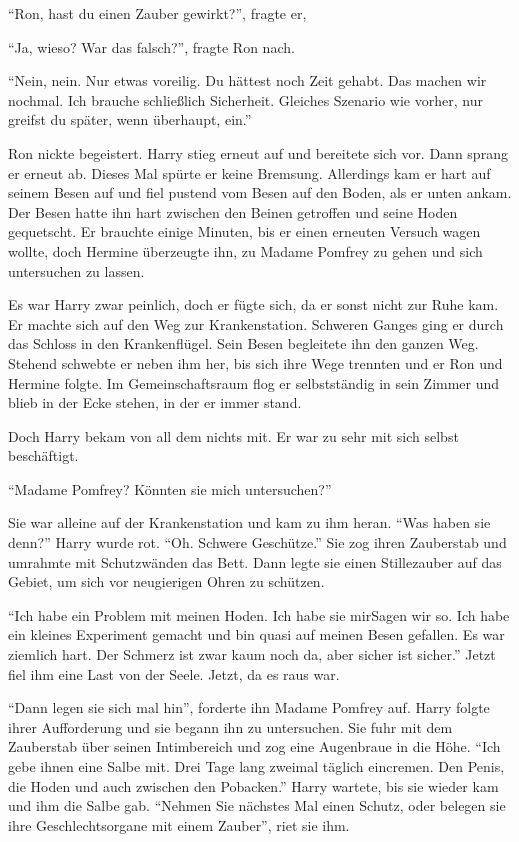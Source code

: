 \enquote{Ron, hast du einen Zauber gewirkt?}, fragte er,

\enquote{Ja, wieso? War das falsch?}, fragte Ron nach.

\enquote{Nein, nein. Nur etwas voreilig. Du hättest noch Zeit gehabt. Das machen wir nochmal. Ich brauche schließlich Sicherheit. Gleiches Szenario wie vorher, nur greifst du später, wenn überhaupt, ein.}

Ron nickte begeistert. Harry stieg erneut auf und bereitete sich vor. Dann sprang er erneut ab. Dieses Mal spürte er keine Bremsung. Allerdings kam er hart auf seinem Besen auf und fiel pustend vom Besen auf den Boden, als er unten ankam. Der Besen hatte ihn hart zwischen den Beinen getroffen und seine Hoden gequetscht. Er brauchte einige Minuten, bis er einen erneuten Versuch wagen wollte, doch Hermine überzeugte ihn, zu Madame Pomfrey zu gehen und sich untersuchen zu lassen.

Es war Harry zwar peinlich, doch er fügte sich, da er sonst nicht zur Ruhe kam. Er machte sich auf den Weg zur Krankenstation. Schweren Ganges ging er durch das Schloss in den Krankenflügel. Sein Besen begleitete ihn den ganzen Weg. Stehend schwebte er neben ihm her, bis sich ihre Wege trennten und er Ron und Hermine folgte. Im Gemeinschaftsraum flog er selbstständig in sein Zimmer und blieb in der Ecke stehen, in der er immer stand.

Doch Harry bekam von all dem nichts mit. Er war zu sehr mit sich selbst beschäftigt.

\enquote{Madame Pomfrey? Könnten sie mich untersuchen?}

Sie war alleine auf der Krankenstation und kam zu ihm heran. \enquote{Was haben sie denn?} Harry wurde rot. \enquote{Oh. Schwere Geschütze.} Sie zog ihren Zauberstab und umrahmte mit Schutzwänden das Bett. Dann legte sie einen Stillezauber auf das Gebiet, um sich vor neugierigen Ohren zu schützen.

\enquote{Ich habe ein Problem mit meinen Hoden. Ich habe sie mir\abs Sagen wir so. Ich habe ein kleines Experiment gemacht und bin quasi auf meinen Besen gefallen. Es war ziemlich hart. Der Schmerz ist zwar kaum noch da, aber sicher ist sicher.} Jetzt fiel ihm eine Last von der Seele. Jetzt, da es raus war.

\enquote{Dann legen sie sich mal hin}, forderte ihn Madame Pomfrey auf. Harry folgte ihrer Aufforderung und sie begann ihn zu untersuchen. Sie fuhr mit dem Zauberstab über seinen Intimbereich und zog eine Augenbraue in die Höhe. \enquote{Ich gebe ihnen eine Salbe mit. Drei Tage lang zweimal täglich eincremen. Den Penis, die Hoden und auch zwischen den Pobacken.} Harry wartete, bis sie wieder kam und ihm die Salbe gab. \enquote{Nehmen Sie nächstes Mal einen Schutz, oder belegen sie ihre Geschlechtsorgane mit einem Zauber}, riet sie ihm.

